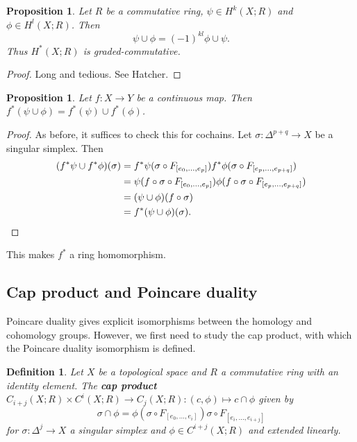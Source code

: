 \documentclass{article}
\newtheorem{definition}[theorem]{Definition}
\newtheorem{proposition}[theorem]{Proposition}
\begin{document}
\begin{proposition}
Let $R$ be a commutative ring, $\psi\in H^k(X;R)$ and $\phi\in H^l(X;R)$. Then \[\psi\cup\phi=(-1)^{kl}\phi\cup\psi.\] Thus $H^*(X;R)$ is graded-commutative.
\end{proposition}
\begin{proof}
Long and tedious. See Hatcher.
\end{proof}

\begin{proposition}
Let $f\colon X\to Y$ be a continuous map. Then $f^*(\psi\cup\phi)=f^*(\psi)\cup f^*(\phi)$.
\end{proposition}
\begin{proof}
As before, it suffices to check this for cochains. Let $\sigma\colon\Delta^{p+q}\to X$ be a singular simplex. Then 
\begin{align*}(f^*\psi\cup f^*\phi)(\sigma)&=f^*\psi(\sigma\circ F_{[e_0,...,e_p]})f^*\phi(\sigma\circ F_{[e_p,...,e_{p+q}]})\\&=\psi(f\circ\sigma\circ F_{[e_0,...,e_p]})\phi(f\circ\sigma\circ F_{[e_p,...,e_{p+q}]})\\&=(\psi\cup\phi)(f\circ\sigma)\\&=f^*(\psi\cup\phi)(\sigma).\qedhere
\end{align*}
\end{proof}

\noindent This makes $f^*$ a ring homomorphism.


\subsection{Cap product and Poincare duality}
Poincare duality gives explicit isomorphisms between the homology and cohomology groups. However, we first need to study the cap product, with which the Poincare duality isomorphism is defined.
\begin{definition}
Let $X$ be a topological space and $R$ a commutative ring with an identity element. The \textbf{cap product} $C_{i+j}(X;R)\times C^i(X;R)\to C_j(X;R):(c,\phi)\mapsto c\cap\phi$ given by \[\sigma\cap\phi=\phi(\sigma\circ F_{[e_0,...,e_i]})\sigma\circ F_{[e_i,...,e_{i+j}]}\] for $\sigma\colon\Delta^j\to X$ a singular simplex and $\phi\in C^{i+j}(X;R)$ and extended linearly.
\end{definition}
\end{document}
